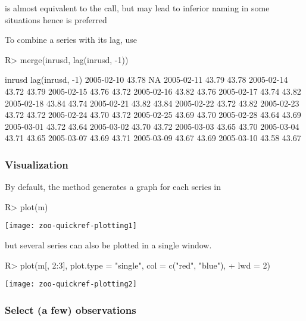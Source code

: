 \documentclass{Z}
\newcommand{\mysection}[1]{\subsubsection[#1]{\textbf{#1}}}
\begin{document}
 is almost equivalent to the 
call, but may lead to inferior naming in some situations 
hence  is preferred

To combine a series with its lag, use
\begin{Schunk}
\begin{Sinput}
R> merge(inrusd, lag(inrusd, -1))
\end{Sinput}
\begin{Soutput}
           inrusd lag(inrusd, -1)
2005-02-10  43.78              NA
2005-02-11  43.79           43.78
2005-02-14  43.72           43.79
2005-02-15  43.76           43.72
2005-02-16  43.82           43.76
2005-02-17  43.74           43.82
2005-02-18  43.84           43.74
2005-02-21  43.82           43.84
2005-02-22  43.72           43.82
2005-02-23  43.72           43.72
2005-02-24  43.70           43.72
2005-02-25  43.69           43.70
2005-02-28  43.64           43.69
2005-03-01  43.72           43.64
2005-03-02  43.70           43.72
2005-03-03  43.65           43.70
2005-03-04  43.71           43.65
2005-03-07  43.69           43.71
2005-03-09  43.67           43.69
2005-03-10  43.58           43.67
\end{Soutput}
\end{Schunk}

\mysection{Visualization}

By default, the  method generates a graph for each
series in 
\begin{center}
\begin{Schunk}
\begin{Sinput}
R> plot(m)
\end{Sinput}
\end{Schunk}
\texttt{[image: zoo-quickref-plotting1]}
\end{center}

but several series can also be plotted in a single window.
\begin{center}
\begin{Schunk}
\begin{Sinput}
R> plot(m[, 2:3], plot.type = "single", col = c("red", "blue"), 
+     lwd = 2)
\end{Sinput}
\end{Schunk}
\texttt{[image: zoo-quickref-plotting2]}
\end{center}

\mysection{Select (a few) observations}
\end{document}

